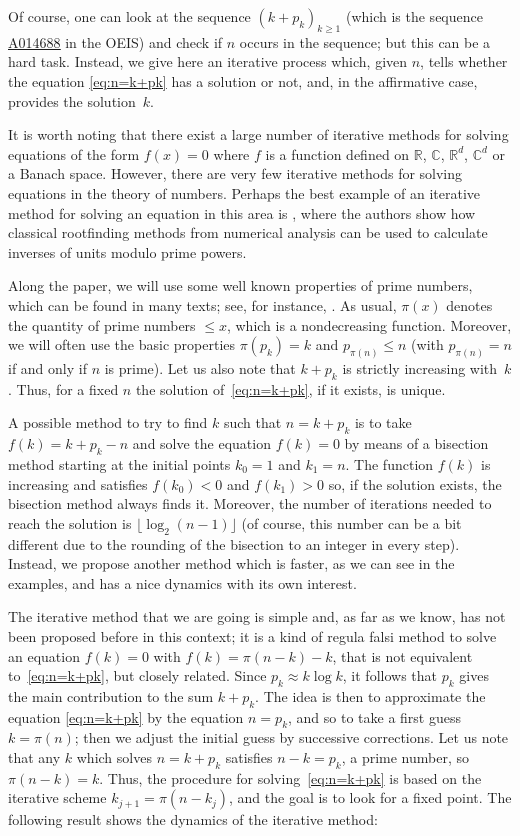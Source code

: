 \documentclass[12pt,reqno]{article}
\newcommand{\seqnum}[1]{\href{https://oeis.org/#1}{\rm \underline{#1}}}
\begin{document}
Of course, one can look at the sequence $(k+p_k)_{k \ge 1}$ (which is the sequence \seqnum{A014688} in the OEIS) and check if $n$ occurs in the sequence; but this can be a hard task. Instead, we give here an iterative process which, given $n$, tells whether the equation \eqref{eq:n=k+pk} has a solution or not, and, in the affirmative case, provides the solution~$k$.

It is worth noting that there exist a large number of iterative methods for solving equations of the form $f(x) = 0$ where $f$ is a function defined on $\mathbb{R}$, $\mathbb{C}$, $\mathbb{R}^d$, $\mathbb{C}^d$ or a Banach space. However, there are very few iterative methods for solving equations in the theory of numbers. 
Perhaps the best example of an iterative method for solving an equation in this area is \cite{KnXe}, where the authors show how classical rootfinding methods from numerical analysis can be used to calculate inverses of units modulo prime powers.

Along the paper, we will use some well known properties of prime numbers, which can be found in many texts; see, for instance, \cite{Apo, BatDia, DKoLu, FiRo, New}. 
As usual, $\pi(x)$ denotes the quantity of prime numbers $\le x$, which is a nondecreasing function. Moreover, we will often use the basic properties $\pi(p_k) = k$ and $p_{\pi(n)} \le n$ (with $p_{\pi(n)} = n$ if and only if $n$ is prime). Let us also note that $k + p_k$ is strictly increasing with~$k$. Thus, for a fixed $n$ the solution of~\eqref{eq:n=k+pk}, if it exists, is unique.

A possible method to try to find $k$ such that $n = k + p_k$ is to take $f(k) = k + p_k - n$ and solve the equation $f(k)=0$ by means of a bisection method starting at the initial points $k_0 = 1$ and $k_1=n$. The function $f(k)$ is increasing and satisfies $f(k_0)<0$ and $f(k_1)>0$ so, if the solution exists, the bisection method always finds it. Moreover, the number of iterations needed to reach the solution is $\lfloor\log_2(n-1)\rfloor$ (of course, this number can be a bit different due to the rounding of the bisection to an integer in every step). Instead, we propose another method which is faster, as we can see in the examples, and has a nice dynamics with its own interest.

The iterative method that we are going is simple and, as far as we know, has not been proposed before in this context; it is a kind of regula falsi method to solve an equation $f(k) = 0$ with $f(k) = \pi(n-k) - k$, that is not equivalent to~\eqref{eq:n=k+pk}, but closely related.
Since $p_k \approx k \log k$, it follows that $p_k$ gives the main contribution to the sum $k+p_k$. 
The idea is then to approximate the equation \eqref{eq:n=k+pk} by the equation $n = p_k$, and so to take a first guess $k = \pi(n)$; then we adjust the initial guess by successive corrections. 
Let us note that any $k$ which solves $n=k+p_k$ satisfies $n-k=p_k$, a prime number, so $\pi(n-k) = k$.
Thus, the procedure for solving~\eqref{eq:n=k+pk} is based on the iterative scheme $k_{j+1} = \pi(n-k_j)$, and the goal is to look for a fixed point.
The following result shows the dynamics of the iterative method:
\end{document}
